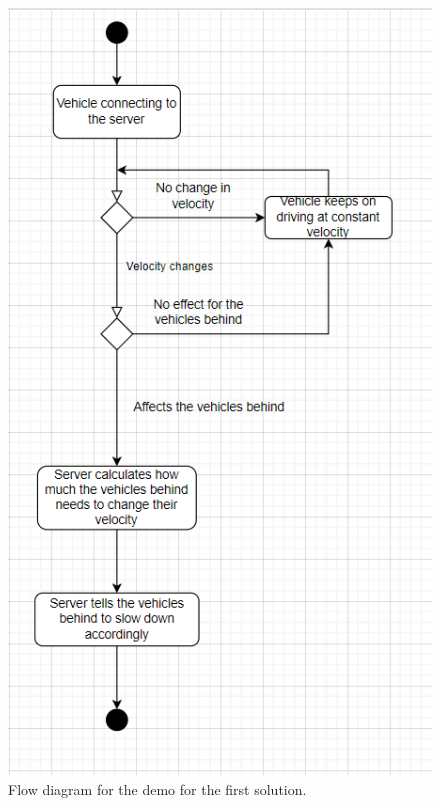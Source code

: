 \begin{figure}[h!]
	\centering
	\includegraphics[width=0.9\linewidth]{figures/flow_diagram_first}
	\caption[Flow diagram server]{Flow diagram for the demo for the first solution.}
	\label{fig:diagramfirst}
\end{figure}